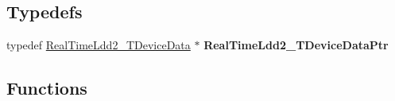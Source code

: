\subsection*{Typedefs}
\begin{DoxyCompactItemize}
\item 
\hypertarget{group___real_time_ldd2__module_gad6879a5d776a6c4ad328e86e1c9ca809}{typedef \hyperlink{struct_real_time_ldd2___t_device_data}{Real\-Time\-Ldd2\-\_\-\-T\-Device\-Data} $\ast$ {\bfseries Real\-Time\-Ldd2\-\_\-\-T\-Device\-Data\-Ptr}}\label{group___real_time_ldd2__module_gad6879a5d776a6c4ad328e86e1c9ca809}

\end{DoxyCompactItemize}
\subsection*{Functions}
